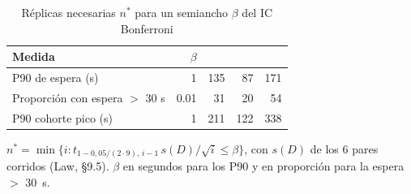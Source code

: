 \begin{table}[H]
\centering
\caption{Réplicas necesarias $n^*$ para un semiancho $\beta$ del IC Bonferroni}
\label{tab:n-necesario}
\small
\begin{tabular}{@{}lrrrr@{}}
\toprule
Medida & $\beta$ & \EI{} & \ET{} & \EIT{} \\
\midrule
P90 de espera (s) & \num{1} & 135 & 87 & 171 \\
Proporción con espera $>$ 30 s & \num{0.01} & 31 & 20 & 54 \\
P90 cohorte pico (s) & \num{1} & 211 & 122 & 338 \\
\bottomrule
\end{tabular}

\smallskip
\footnotesize $n^* = \min\{i : t_{1-0{,}05/(2\cdot9),\,i-1}\, s(D)/\sqrt{i} \le \beta\}$, con $s(D)$ de
los 6 pares corridos (Law, §9.5). $\beta$ en segundos para los P90 y en proporción para la espera $>$ 30~s.
\end{table}
